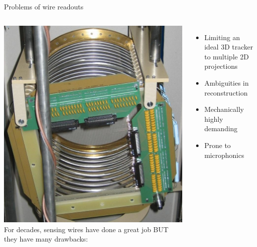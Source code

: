 \documentclass[]{beamer}
\newcommand*{\emphcol}{red}
\begin{document}
\begin{frame}{Problems of wire readouts}
	\begin{columns}[c]
		\centering
		\includegraphics[width=\textwidth]{defence/mat_wires}
		For decades, sensing wires have done a great job
		BUT they have many drawbacks:
		\begin{itemize}
			\item {\color{\emphcol} Limiting an ideal 3D tracker to multiple 2D projections}
			\item Ambiguities in reconstruction
			\item Mechanically highly demanding
			\item Prone to microphonics
		\end{itemize}
	\end{columns}
\end{frame}
\end{document}
